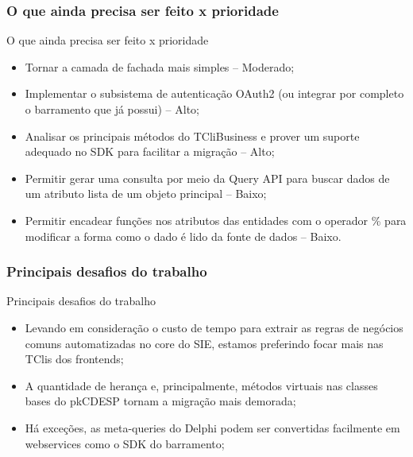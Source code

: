 \documentclass{beamer}
\begin{document}
\begin{frame}
\frametitle{O que ainda precisa ser feito x prioridade}

\begin{exampleblock}{O que ainda precisa ser feito x prioridade}
	
	\begin{itemize}
		\item<1->Tornar a camada de fachada mais simples -- Moderado;
		\item<1->Implementar o subsistema de autenticação OAuth2 (ou integrar por completo o barramento que já possui) -- Alto;
		\item<1->Analisar os principais métodos do TCliBusiness e prover um suporte adequado no SDK para facilitar a migração -- Alto;
		\item<1->Permitir gerar uma consulta por meio da Query API para buscar dados de um atributo lista de um objeto principal -- Baixo;
		\item<1->Permitir encadear funções nos atributos das entidades com o operador \% para modificar a forma como o dado é lido da fonte de dados -- Baixo.
		
		
	\end{itemize}
	
\end{exampleblock}







\end{frame}


\begin{frame}
\frametitle{Principais desafios do trabalho}

\begin{exampleblock}{Principais desafios do trabalho}
	\small{
	\begin{itemize}
		\item<1->Levando em consideração o custo de tempo para extrair as regras de negócios comuns automatizadas no core do SIE, estamos preferindo focar mais nas TClis dos frontends;
		\item<1->A quantidade de herança e, principalmente, métodos virtuais nas classes bases do pkCDESP tornam a migração mais demorada;
		\item<1->Há exceções, as meta-queries do Delphi podem ser convertidas facilmente em webservices como o SDK do barramento;
	\end{itemize}
}
\end{exampleblock}

\end{frame}
\end{document}
